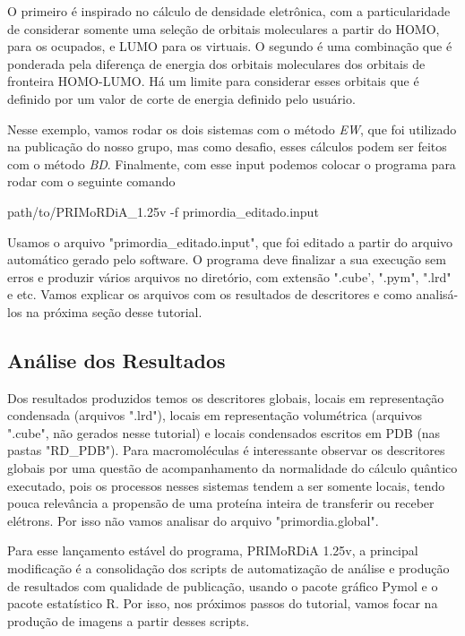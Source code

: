 \documentclass[a4paper,11pt]{refart}
\begin{document}
	O primeiro é inspirado no cálculo de densidade eletrônica, com a particularidade de considerar somente uma seleção de orbitais moleculares a partir do HOMO, para os ocupados, e LUMO para os virtuais. O segundo é uma combinação que é ponderada pela diferença de energia dos orbitais moleculares dos orbitais de fronteira HOMO-LUMO. Há um limite para considerar esses orbitais que é definido por um valor de corte de energia definido pelo usuário.
	
	Nesse exemplo, vamos rodar os dois sistemas com o método \textit{EW}, que foi utilizado na publicação do nosso grupo, mas como desafio, esses cálculos podem ser feitos com o método \textit{BD}.	Finalmente, com esse input podemos colocar o programa para rodar com o seguinte comando
	
	
	\hspace*{-\leftmarginwidth}
	\begin{minipage}{\fullwidth}
		\begin{commandshell}path/to/PRIMoRDiA_1.25v -f primordia_editado.input\end{commandshell}
	\end{minipage}
	
	Usamos o arquivo "primordia\_editado.input", que foi editado a partir do arquivo automático gerado pelo software.
	O programa deve finalizar a sua execução sem erros e produzir vários arquivos no diretório, com extensão ".cube', ".pym", ".lrd" e etc. Vamos explicar os arquivos com os resultados de descritores e como analisá-los na próxima seção desse tutorial.
	
	\subsection{Análise dos Resultados}	
	
	Dos resultados produzidos temos os descritores globais, locais em representação condensada (arquivos ".lrd"), locais em representação volumétrica (arquivos ".cube", não gerados nesse tutorial) e locais condensados escritos em PDB (nas pastas "RD\_PDB"). Para macromoléculas é interessante observar os descritores globais por uma questão de acompanhamento da normalidade do cálculo quântico executado, pois os processos nesses sistemas tendem a ser somente locais, tendo pouca relevância a propensão de uma proteína inteira de transferir ou receber elétrons. Por isso não vamos analisar do arquivo "primordia.global".
	
	Para esse lançamento estável do programa, PRIMoRDiA 1.25v, a principal modificação é a consolidação dos scripts de automatização de análise e produção de resultados com qualidade de publicação, usando o pacote gráfico Pymol e o pacote estatístico R. Por isso, nos próximos passos do tutorial, vamos focar na produção de imagens a partir desses scripts.
	
\end{document}
